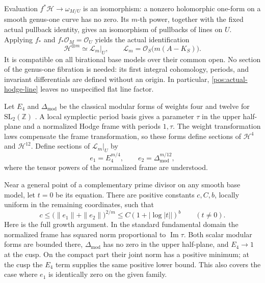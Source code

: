 \documentclass[11pt,letterpaper]{article}
\newcommand{\Z}{\mathbb{Z}}
\newcommand{\OO}{\mathcal{O}}
\theoremstyle{definition}
\theoremstyle{remark}
\begin{document}
Evaluation \(f^*\mathcal H\to\omega_{M/U}\) is an isomorphism:
a nonzero holomorphic one-form on a smooth genus-one curve has no zero.
Its \(m\)-th power, together with the fixed actual pullback identity,
gives an isomorphism of pullbacks of lines on \(U\). Applying
\(f_*\) and \(f_*\OO_M=\OO_U\) yields the actual identification
\begin{equation}\label{pos:actual-hodge-line}
 \mathcal H^{\otimes m}\simeq\mathcal L_m|_U,
 \qquad\mathcal L_m=\OO_S\bigl(m(A-K_S)\bigr).
\end{equation}
It is compatible on all birational base models over their common
open. No section of the genus-one fibration is needed: its first
integral cohomology, periods, and invariant differentials are defined
without an origin. In particular, \eqref{pos:actual-hodge-line}
leaves no unspecified flat line factor.

Let \(E_4\) and \(\Delta_{\mathrm{mod}}\) be the classical modular
forms of weights four and twelve for \(\mathrm{SL}_2(\Z)\)
\cite[Chapter~VII]{SerreArithmetic}. A local symplectic period basis
gives a parameter \(\tau\) in the upper half-plane and a normalized
Hodge frame with periods \(1,\tau\). The weight transformation laws
compensate the frame transformation, so these forms define sections
of \(\mathcal H^4\) and \(\mathcal H^{12}\). Define sections of
\(\mathcal L_m|_U\) by
\begin{equation}\label{pos:modular-sections}
 e_1=E_4^{m/4},\qquad e_2=\Delta_{\mathrm{mod}}^{m/12},
\end{equation}
where the tensor powers of the normalized frame are understood.

Near a general point of a complementary prime divisor on any smooth
base model, let \(t=0\) be its equation. There are positive constants
\(c,C,b\), locally uniform in the remaining coordinates, such that
\begin{equation}\label{pos:modular-growth}
 c\leq\bigl(\|e_1\|+\|e_2\|\bigr)^{2/m}
 \leq C(1+|\log|t||)^b\qquad(t\ne0).
\end{equation}
Here is the full growth argument. In the standard fundamental domain
the normalized frame has squared norm proportional to
\(\operatorname{Im}\tau\). Both scalar modular forms are bounded
there, \(\Delta_{\mathrm{mod}}\) has no zero in the upper half-plane,
and \(E_4\to1\) at the cusp. On the compact part their joint norm has
a positive minimum; at the cusp the \(E_4\) term supplies the same
positive lower bound. This also covers the case where \(e_1\) is
identically zero on the given family.
\end{document}
